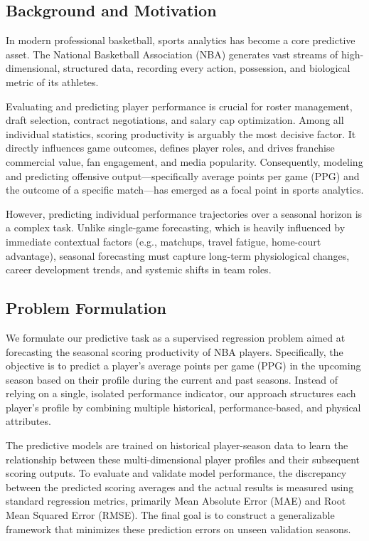\documentclass[conference]{IEEEtran}
\begin{document}
\subsection{Background and Motivation}
In modern professional basketball, sports analytics has become a core predictive asset. The National Basketball Association (NBA) generates vast streams of high-dimensional, structured data, recording every action, possession, and biological metric of its athletes. 

Evaluating and predicting player performance is crucial for roster management, draft selection, contract negotiations, and salary cap optimization. Among all individual statistics, scoring productivity is arguably the most decisive factor. It directly influences game outcomes, defines player roles, and drives franchise commercial value, fan engagement, and media popularity. Consequently, modeling and predicting offensive output---specifically average points per game (PPG) and the outcome of a specific match---has emerged as a focal point in sports analytics. 

However, predicting individual performance trajectories over a seasonal horizon is a complex task. Unlike single-game forecasting, which is heavily influenced by immediate contextual factors (e.g., matchups, travel fatigue, home-court advantage), seasonal forecasting must capture long-term physiological changes, career development trends, and systemic shifts in team roles. 

\subsection{Problem Formulation}
We formulate our predictive task as a supervised regression problem aimed at forecasting the seasonal scoring productivity of NBA players. Specifically, the objective is to predict a player's average points per game (PPG) in the upcoming season based on their profile during the current and past seasons. Instead of relying on a single, isolated performance indicator, our approach structures each player's profile by combining multiple historical, performance-based, and physical attributes. 

The predictive models are trained on historical player-season data to learn the relationship between these multi-dimensional player profiles and their subsequent scoring outputs. To evaluate and validate model performance, the discrepancy between the predicted scoring averages and the actual results is measured using standard regression metrics, primarily Mean Absolute Error (MAE) and Root Mean Squared Error (RMSE). The final goal is to construct a generalizable framework that minimizes these prediction errors on unseen validation seasons.
\end{document}

